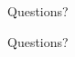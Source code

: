 \documentclass[
  9pt
  , table
  , ignorenonframetext
]{beamer}
\begin{document}

\begin{frame}{Questions?}
  \begin{center}
    {\Huge Questions?}
  \end{center}
\end{frame}



%
%
\end{document}
